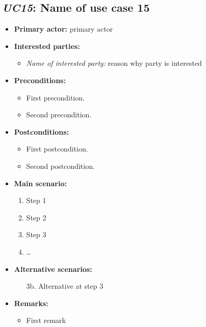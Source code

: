 \documentclass[a4paper,10pt]{article}
\begin{document}
\subsection{\emph{UC15}: Name of use case 15}
\begin{itemize}
    \item \textbf{Primary actor:} primary actor
    \item \textbf{Interested parties:} 
        \begin{itemize}
            \item \textit{Name of interested party:} reason why party is interested
        \end{itemize}

    \item \textbf{Preconditions:}
        \begin{itemize}
            \item First precondition.
            \item Second precondition.
        \end{itemize}

    \item \textbf{Postconditions:}
        \begin{itemize}
            \item First postcondition.
            \item Second postcondition.
        \end{itemize}
        
    \item \textbf{Main scenario:} 
    \begin{enumerate}
       \item Step 1
       \item Step 2
       \item Step 3
       \item \ldots
    \end{enumerate}

    \item \textbf{Alternative scenarios:} 
    \begin{enumerate}
        \item [3b.] Alternative at step 3
    \end{enumerate}
    
    \item \textbf{Remarks:}
        \begin{itemize}
            \item First remark
        \end{itemize}
\end{itemize}
\end{document}
